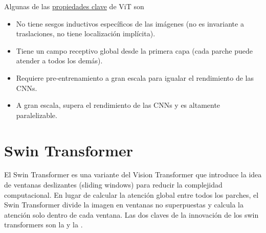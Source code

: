 \noindent
Algunas de las \underline{propiedades clave} de ViT son
\begin{itemize}
    \item No tiene sesgos inductivos específicos de las imágenes (no es invariante a traslaciones, no tiene localización implícita).
    \item Tiene un campo receptivo global desde la primera capa (cada parche puede atender a todos los demás).
    \item Requiere pre-entrenamiento a gran escala para igualar el rendimiento de las CNNs.
    \item A gran escala, supera el rendimiento de las CNNs y es altamente paralelizable.
\end{itemize}


\section{Swin Transformer}
\noindent
El Swin Transformer es una variante del Vision Transformer que introduce la idea de ventanas deslizantes (sliding windows) para reducir la complejidad computacional. En lugar de calcular la atención global entre todos los parches, el Swin Transformer divide la imagen en ventanas no superpuestas y calcula la atención solo dentro de cada ventana. Las dos claves de la innovación de los swin transformers son la  y la . \\ 


